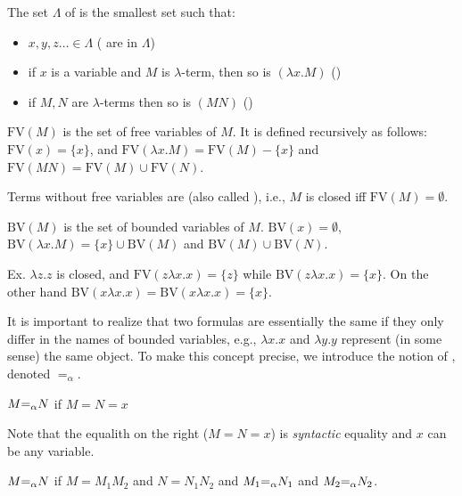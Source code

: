 \begin{frame}

The set $\Lambda$ of  is the smallest set such
that:
\begin{itemize}
\item $x,y,z\ldots\in\Lambda$ ( are in $\Lambda$)
\item if $x$ is a variable and $M$ is $\lambda$-term, then so is
$(\lambda x.M)$ ()
\item if $M,N$ are $\lambda$-terms then so is $(MN)$
()
\end{itemize}

$\text{FV}(M)$ is the set of free variables of $M$.  It is defined
recursively as follows: $\text{FV}(x)=\{x\}$, and $\text{FV}(\lambda
x.M)=\text{FV}(M)-\{x\}$ and
$\text{FV}(MN)=\text{FV}(M)\cup\text{FV}(N)$.

Terms without free variables are  (also called
), i.e., $M$ is closed iff $\text{FV}(M)=\emptyset$.

$\text{BV}(M)$ is the set of bounded variables of $M$.
$\text{BV}(x)=\emptyset$, $\text{BV}(\lambda
x.M)=\{x\}\cup\text{BV}(M)$ and $\text{BV}(M)\cup\text{BV}(N)$.
\end{frame}

\begin{frame}
Ex. $\lambda z.z$ is closed, and $\text{FV}(z\lambda x.x)=\{z\}$ while
$\text{BV}(z\lambda x.x)=\{x\}$.  On the other hand
$\text{BV}(x\lambda x.x)=\text{BV}(x\lambda x.x)=\{x\}$.

It is important to realize that two formulas are essentially the same
if they only differ in the names of bounded variables, e.g., $\lambda
x.x$ and $\lambda y.y$ represent (in some sense) the same object.  To
make this concept precise, we introduce the notion of
, denoted $=_\alpha$.

$M{=_\alpha} N$ if $M=N=x$

Note that the equalith on the right ($M=N=x$) is {\em syntactic}
equality and $x$ can be any variable.

$M{=_\alpha} N$ if $M=M_1M_2$ and $N=N_1N_2$ and $M_1{=_\alpha} N_1$ and $M_2{=_\alpha}
N_2$.
\end{frame}

